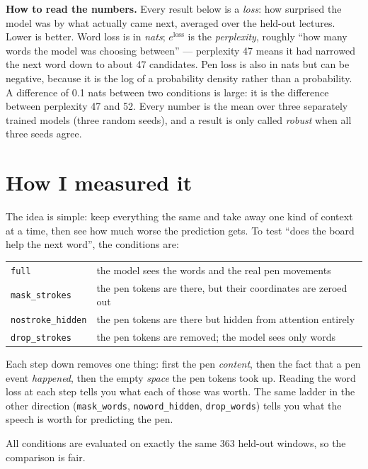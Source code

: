 \documentclass[11pt]{article}
\newcommand{\cond}[1]{\texttt{#1}}
\newcommand{\guidebox}[1]{%
  \noindent\colorbox{boxbg}{\parbox{\dimexpr\linewidth-2\fboxsep}{\small #1}}\par\medskip}
\begin{document}
\guidebox{%
\textbf{How to read the numbers.} Every result below is a \emph{loss}: how surprised the model was by what actually came next, averaged over the held-out lectures. Lower is better. Word loss is in \emph{nats}; $e^{\text{loss}}$ is the \emph{perplexity}, roughly ``how many words the model was choosing between'' --- perplexity 47 means it had narrowed the next word down to about 47 candidates. Pen loss is also in nats but can be negative, because it is the log of a probability density rather than a probability. A difference of 0.1 nats between two conditions is large: it is the difference between perplexity 47 and 52. Every number is the mean over three separately trained models (three random seeds), and a result is only called \emph{robust} when all three seeds agree.}

\section{How I measured it}
\label{sec:measure}

The idea is simple: keep everything the same and take away one kind of context at a time, then see how much worse the prediction gets. To test ``does the board help the next word'', the conditions are:

\begin{center}
\small
\begin{tabular}{@{}l l@{}}
\toprule
\cond{full}            & the model sees the words and the real pen movements \\
\cond{mask\_strokes}   & the pen tokens are there, but their coordinates are zeroed out \\
\cond{nostroke\_hidden}& the pen tokens are there but hidden from attention entirely \\
\cond{drop\_strokes}   & the pen tokens are removed; the model sees only words \\
\bottomrule
\end{tabular}
\end{center}

Each step down removes one thing: first the pen \emph{content}, then the fact that a pen event \emph{happened}, then the empty \emph{space} the pen tokens took up. Reading the word loss at each step tells you what each of those was worth. The same ladder in the other direction (\cond{mask\_words}, \cond{noword\_hidden}, \cond{drop\_words}) tells you what the speech is worth for predicting the pen.

All conditions are evaluated on exactly the same 363 held-out windows, so the comparison is fair.
\end{document}

